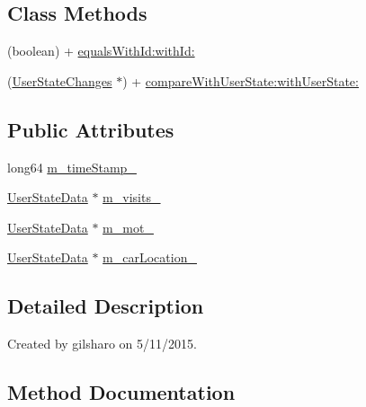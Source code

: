 \subsection*{Class Methods}
\begin{DoxyCompactItemize}
\item 
(boolean) + \hyperlink{interface_user_state_a166de4c7cec43ca1c3fd71dcac726d47}{equals\+With\+Id\+:with\+Id\+:}
\item 
(\hyperlink{interface_user_state_changes}{User\+State\+Changes} $\ast$) + \hyperlink{interface_user_state_a1ea514813172ae31069dadf4cfe06a7e}{compare\+With\+User\+State\+:with\+User\+State\+:}
\end{DoxyCompactItemize}
\subsection*{Public Attributes}
\begin{DoxyCompactItemize}
\item 
long64 \hyperlink{interface_user_state_adb2239662f6c0ac35617b9a629e8938f}{m\+\_\+time\+Stamp\+\_\+}
\item 
\hyperlink{interface_user_state_data}{User\+State\+Data} $\ast$ \hyperlink{interface_user_state_aa2d7c286570721957782376a23f7b462}{m\+\_\+visits\+\_\+}
\item 
\hyperlink{interface_user_state_data}{User\+State\+Data} $\ast$ \hyperlink{interface_user_state_aa39ee1f018ba0d159d5eb5395482a356}{m\+\_\+mot\+\_\+}
\item 
\hyperlink{interface_user_state_data}{User\+State\+Data} $\ast$ \hyperlink{interface_user_state_a6f4df56e77b3dba4241ca12d862d147a}{m\+\_\+car\+Location\+\_\+}
\end{DoxyCompactItemize}


\subsection{Detailed Description}
Created by gilsharo on 5/11/2015. 

\subsection{Method Documentation}
\hypertarget{interface_user_state_a1ea514813172ae31069dadf4cfe06a7e}{}
